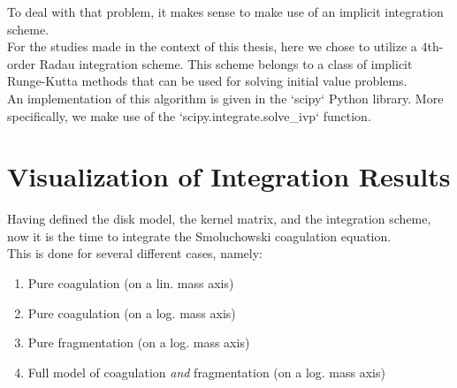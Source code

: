         To deal with that problem, it makes sense to make use of an implicit integration scheme. \\

        For the studies made in the context of this thesis, here we chose to utilize 
        a 4th-order Radau integration scheme. This scheme belongs to a class of 
        implicit Runge-Kutta methods that can be used for solving initial value problems. \\

        An implementation of this algorithm is given in the `scipy` Python library. More 
        specifically, we make use of the `scipy.integrate.solve\_ivp` function.








\clearpage\section{Visualization of Integration Results}

    Having defined the disk model, the kernel matrix, and the integration scheme, now it 
    is the time to integrate the Smoluchowski coagulation equation. \\ 

    This is done for several different cases, namely: 
    \begin{enumerate}
        \item Pure coagulation (on a lin. mass axis)
        \item Pure coagulation (on a log. mass axis)
        \item Pure fragmentation (on a log. mass axis)
        \item Full model of coagulation \textit{and} fragmentation (on a log. mass axis)
    \end{enumerate}

